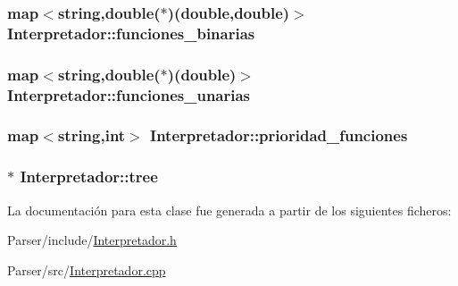 \subsubsection[{\texorpdfstring{funciones\+\_\+binarias}{funciones_binarias}}]{\setlength{\rightskip}{0pt plus 5cm}map$<$string,double($\ast$)(double,double)$>$ Interpretador\+::funciones\+\_\+binarias}\hypertarget{class_interpretador_aae54d44f01e4c4b755ae133819b49d78}{}\label{class_interpretador_aae54d44f01e4c4b755ae133819b49d78}
\subsubsection[{\texorpdfstring{funciones\+\_\+unarias}{funciones_unarias}}]{\setlength{\rightskip}{0pt plus 5cm}map$<$string,double($\ast$)(double)$>$ Interpretador\+::funciones\+\_\+unarias}\hypertarget{class_interpretador_a69b4c0a967ebb3300bdd1a0d768be777}{}\label{class_interpretador_a69b4c0a967ebb3300bdd1a0d768be777}
\subsubsection[{\texorpdfstring{prioridad\+\_\+funciones}{prioridad_funciones}}]{\setlength{\rightskip}{0pt plus 5cm}map$<$string,int$>$ Interpretador\+::prioridad\+\_\+funciones}\hypertarget{class_interpretador_a5ba0987e974f7eaba6376e0539466788}{}\label{class_interpretador_a5ba0987e974f7eaba6376e0539466788}
\subsubsection[{\texorpdfstring{tree}{tree}}]{$\ast$ Interpretador\+::tree}\hypertarget{class_interpretador_a95ae1c37ba98e88aeffec2807eb3f332}{}\label{class_interpretador_a95ae1c37ba98e88aeffec2807eb3f332}


La documentación para esta clase fue generada a partir de los siguientes ficheros\+:\begin{DoxyCompactItemize}
\item 
Parser/include/\hyperlink{_interpretador_8h}{Interpretador.\+h}\item 
Parser/src/\hyperlink{_interpretador_8cpp}{Interpretador.\+cpp}\end{DoxyCompactItemize}
